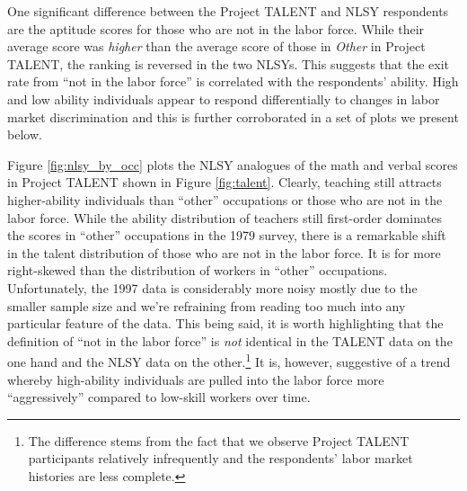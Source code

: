 \documentclass[onehalfspacing,11pt]{article}
\begin{document}
One significant difference between the Project TALENT and NLSY respondents are the aptitude scores for those who are not in the labor force. While their average score was {\it higher} than the average score of those in {\it Other} in Project TALENT, the ranking is reversed in the two NLSYs. This suggests that the exit rate from ``not in the labor force'' is correlated with the respondents' ability. High and low ability individuals appear to respond differentially to changes in labor market discrimination and this is further corroborated in a set of plots we present below. 

Figure \ref{fig:nlsy_by_occ} plots the NLSY analogues of the math and verbal scores in Project TALENT shown in Figure \ref{fig:talent}. Clearly, teaching still attracts higher-ability individuals than ``other'' occupations or those who are not in the labor force. While the ability distribution of teachers still first-order dominates the scores in ``other'' occupations in the 1979 survey, there is a remarkable shift in the talent distribution of those who are not in the labor force. It is for more right-skewed than the distribution of workers in ``other'' occupations. Unfortunately, the 1997 data is considerably more noisy mostly due to the smaller sample size and we're refraining from reading too much into any particular feature of the data. This being said, it is worth highlighting that the definition of ``not in the labor force'' is {\it not} identical in the TALENT data on the one hand and the NLSY data on the other.\footnote{The difference stems from the fact that we observe Project TALENT participants relatively infrequently and the respondents' labor market histories are less complete.} It is, however, suggestive of a trend whereby high-ability individuals are pulled into the labor force more ``aggressively'' compared to low-skill workers over time.
\end{document}
